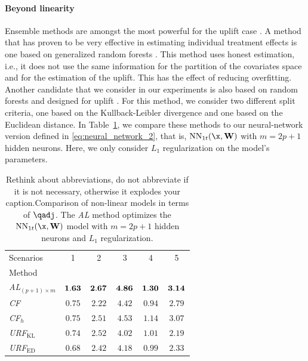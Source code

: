\paragraph{Beyond linearity}

Ensemble methods are amongst the most powerful for the uplift case \citep{soltys2015ensemble}. A method that has proven to be very effective in estimating individual treatment effects is one based on generalized random forests \citep{athey2019generalized}. This method uses honest estimation, i.e., it does not use the same information for the partition of the covariates space and for the estimation of the uplift. This has the effect of reducing overfitting. Another candidate that we consider in our experiments is also based on random forests and designed for uplift \citep{rzepakowski2010decision,guelman2012random}. For this method, we consider two different split criteria, one based on the Kullback-Leibler divergence and one based on the Euclidean distance. In Table~\ref{tab:beyond_linearity_results}, we compare these methods to our neural-network version defined in \eqref{eq:neural_network_2}, that is, $\mathrm{NN}_{1t}(\x, \mathbf{W})$  with $m=2p+1$ hidden neurons. Here, we only consider $L_1$ regularization on the model's parameters.

\begin{table}[!ht]
    \centering
    \caption{{ Rethink about abbreviations, do not abbreviate if it is not necessary, otherwise it explodes your caption.}Comparison of non-linear models in terms of $\qadj$. The {\it AL} method optimizes the $\mathrm{NN}_{1t}(\x, \mathbf{W})$ model with $m=2p+1$ hidden neurons and $L_1$ regularization.}
    \label{tab:beyond_linearity_results}
    \begin{tabular}{l|ccccc}
        Scenarios & 1 & 2 & 3 & 4 & 5\\
        Method & & & & &\\
        \hline
        {\it AL$_{(p+1)\times m}$} & $\bf 1.63$ & $\bf 2.67$  & $\bf 4.86$ & $\bf 1.30$ & $\bf 3.14$\\
        {\it CF} & $0.75$ & $2.22$ & $4.42$ & $0.94$ & $2.79$ \\
        {\it CF$_{h}$} & $0.75$  & $2.51$ & $4.53$ & $1.14$ & $3.07$\\
        {\it URF$_{\mathrm{KL}}$} & $0.74$ & $2.52$ & $4.02$ & $1.01$& $2.19$ \\
        {\it URF$_{\mathrm{ED}}$} & $0.68$ & $2.42$ & $4.18$ & $0.99$ & $2.33$ \\
        \hline
    \end{tabular}
   
\end{table}



